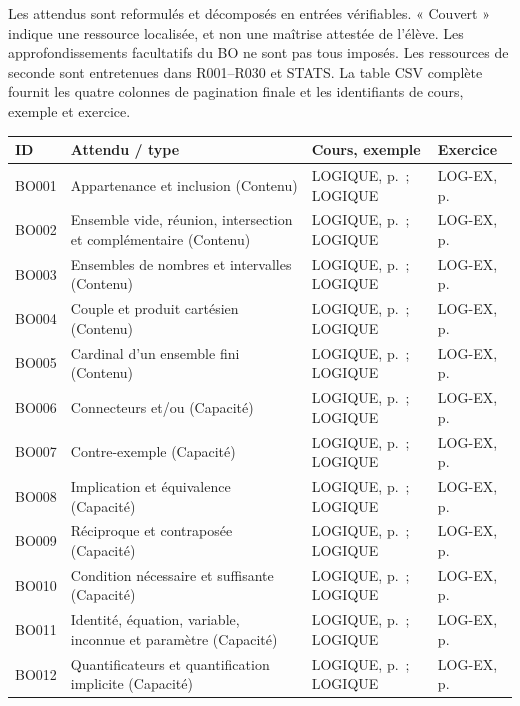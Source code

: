 \label{MATRICE}
Les attendus sont reformulés et décomposés en entrées vérifiables. « Couvert » indique une ressource localisée, et non une maîtrise attestée de l’élève. Les approfondissements facultatifs du BO ne sont pas tous imposés. Les ressources de seconde sont entretenues dans R001–R030 et STATS. La table CSV complète fournit les quatre colonnes de pagination finale et les identifiants de cours, exemple et exercice.
\small\begin{longtable}{p{.1\linewidth}p{.43\linewidth}p{.19\linewidth}p{.16\linewidth}}\toprule ID & Attendu / type & Cours, exemple & Exercice \\\midrule\endhead
BO001 & Appartenance et inclusion (Contenu) & LOGIQUE, p.\,\pageref{LOGIQUE} ; LOGIQUE & LOG-EX, p.\,\pageref{LOG-EX} \\
BO002 & Ensemble vide, réunion, intersection et complémentaire (Contenu) & LOGIQUE, p.\,\pageref{LOGIQUE} ; LOGIQUE & LOG-EX, p.\,\pageref{LOG-EX} \\
BO003 & Ensembles de nombres et intervalles (Contenu) & LOGIQUE, p.\,\pageref{LOGIQUE} ; LOGIQUE & LOG-EX, p.\,\pageref{LOG-EX} \\
BO004 & Couple et produit cartésien (Contenu) & LOGIQUE, p.\,\pageref{LOGIQUE} ; LOGIQUE & LOG-EX, p.\,\pageref{LOG-EX} \\
BO005 & Cardinal d’un ensemble fini (Contenu) & LOGIQUE, p.\,\pageref{LOGIQUE} ; LOGIQUE & LOG-EX, p.\,\pageref{LOG-EX} \\
BO006 & Connecteurs et/ou (Capacité) & LOGIQUE, p.\,\pageref{LOGIQUE} ; LOGIQUE & LOG-EX, p.\,\pageref{LOG-EX} \\
BO007 & Contre-exemple (Capacité) & LOGIQUE, p.\,\pageref{LOGIQUE} ; LOGIQUE & LOG-EX, p.\,\pageref{LOG-EX} \\
BO008 & Implication et équivalence (Capacité) & LOGIQUE, p.\,\pageref{LOGIQUE} ; LOGIQUE & LOG-EX, p.\,\pageref{LOG-EX} \\
BO009 & Réciproque et contraposée (Capacité) & LOGIQUE, p.\,\pageref{LOGIQUE} ; LOGIQUE & LOG-EX, p.\,\pageref{LOG-EX} \\
BO010 & Condition nécessaire et suffisante (Capacité) & LOGIQUE, p.\,\pageref{LOGIQUE} ; LOGIQUE & LOG-EX, p.\,\pageref{LOG-EX} \\
BO011 & Identité, équation, variable, inconnue et paramètre (Capacité) & LOGIQUE, p.\,\pageref{LOGIQUE} ; LOGIQUE & LOG-EX, p.\,\pageref{LOG-EX} \\
BO012 & Quantificateurs et quantification implicite (Capacité) & LOGIQUE, p.\,\pageref{LOGIQUE} ; LOGIQUE & LOG-EX, p.\,\pageref{LOG-EX} \\

\end{longtable}
